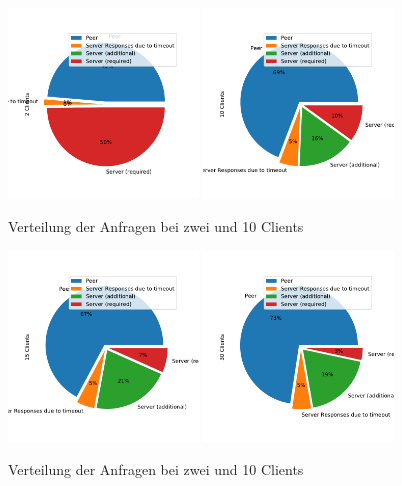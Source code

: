 \begin{figure}[!h]
	\centering
	\includegraphics[width=0.45\textwidth]{figures/pie_2_clients}
	\includegraphics[width=0.45\textwidth]{figures/pie_10_clients}
	\caption[A Figure Short-Title]{Verteilung der Anfragen bei zwei und 10 Clients}
	\label{fig:corporate_pie_2}
\end{figure}
\begin{figure}[!h]
	\centering
	\includegraphics[width=0.45\textwidth]{figures/pie_15_clients}
	\includegraphics[width=0.45\textwidth]{figures/pie_30_clients}
	\caption[A Figure Short-Title]{Verteilung der Anfragen bei zwei und 10 Clients}
	\label{fig:corporate_pie_3}
\end{figure}


